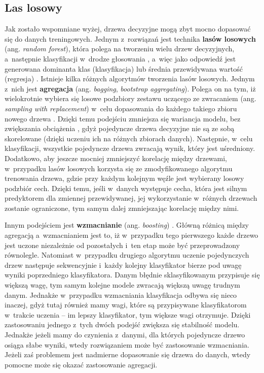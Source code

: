 \subsection{Las losowy}
\label{cha:Las losowy}

Jak zostało wspomniane wyżej, drzewa decyzyjne mogą zbyt mocno dopasować się do danych treningowych. Jednym z~rozwiązań jest technika \textbf{lasów losowych} (ang. \textit{random forest}), która polega na tworzeniu wielu drzew decyzyjnych, a~następnie klasyfikacji w~drodze głosowania \cite{Grus18}, a~więc jako odpowiedź jest generowana dominanta klas (klasyfikacja) lub średnia przewidywana wartość (regresja) \cite{Ho95}. Istnieje kilka różnych algorytmów tworzenia lasów losowych. Jednym z~nich jest \textbf{agregacja} (ang. \textit{bagging}, \textit{bootstrap aggregating}). Polega on na tym, iż wielokrotnie wybiera się losowe podzbiory zestawu uczącego ze zwracaniem (ang. \textit{sampling with replacement}) w~celu dopasowania do każdego takiego zbioru nowego drzewa \cite{Sawka18}. Dzięki temu podejściu zmniejsza się wariancja modelu, bez zwiększania obciążenia \cite{Ramchandani18}, gdyż pojedyncze drzewa decyzyjne nie są ze sobą skorelowane (dzięki uczeniu ich na różnych zbiorach danych). Następnie, w~celu klasyfikacji, wszystkie pojedyncze drzewa zwracają wynik, który jest uśredniony. Dodatkowo, aby jeszcze mocniej zmniejszyć korelację między drzewami, w~przypadku lasów losowych korzysta się ze zmodyfikowanego algorytmu trenowania drzewa, gdzie przy każdym kolejnym węźle jest wybierany losowy podzbiór cech. Dzięki temu, jeśli w~danych występuje cecha, która jest silnym predyktorem dla zmiennej przewidywanej, jej wykorzystanie w~różnych drzewach zostanie ograniczone, tym samym dalej zmniejszając korelację między nimi.

Innym podejściem jest \textbf{wzmacnianie} (ang. \textit{boosting}) \cite{aporras}. Główną różnicą między agregacją a~wzmacnianiem jest to, iż w~przypadku tego pierwszego każde drzewo jest uczone niezależnie od pozostałych i~ten etap może być przeprowadzony równolegle. Natomiast w~przypadku drugiego algorytmu uczenie pojedynczych drzew następuje sekwencyjnie i~każdy kolejny klasyfikator bierze pod uwagę wyniki poprzedniego klasyfikatora. Danym błędnie sklasyfikowanym przypisuje się większą wagę, tym samym kolejne modele zwracają większą uwagę trudnym danym. Jednakże w~przypadku wzmacniania klasyfikacja odbywa się nieco inaczej, gdyż tutaj również mamy wagi, które są przypisywane klasyfikatorom w~trakcie uczenia – im lepszy klasyfikator, tym większe wagi otrzymuje. Dzięki zastosowaniu jednego z~tych dwóch podejść zwiększa się stabilność modelu. Jednakże jeżeli mamy do czynienia z~danymi, dla których pojedyncze drzewo osiąga słabe wyniki, wtedy rozwiązaniem może być zastosowanie wzmacniania. Jeżeli zaś problemem jest nadmierne dopasowanie się drzewa do danych, wtedy pomocne może się okazać zastosowanie agregacji.

